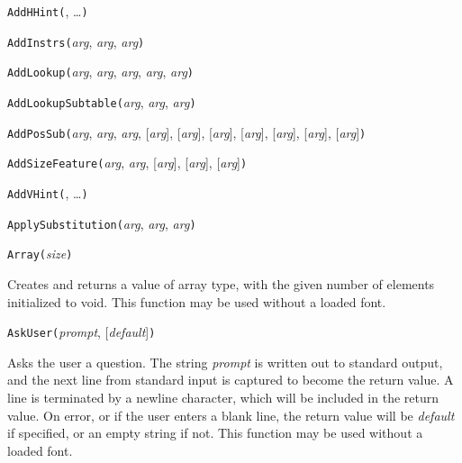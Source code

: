 
\noindent\texttt{AddHHint(}, \ldots\texttt{)}


\noindent\texttt{AddInstrs(}\textit{arg}, \textit{arg}, \textit{arg}\texttt{)}


\noindent\texttt{AddLookup(}\textit{arg}, \textit{arg}, \textit{arg}, \textit{arg}, \textit{arg}\texttt{)}


\noindent\texttt{AddLookupSubtable(}\textit{arg}, \textit{arg}, \textit{arg}\texttt{)}


\noindent\texttt{AddPosSub(}\textit{arg}, \textit{arg}, \textit{arg}, [\textit{arg}], [\textit{arg}], [\textit{arg}], [\textit{arg}], [\textit{arg}], [\textit{arg}], [\textit{arg}]\texttt{)}


\noindent\texttt{AddSizeFeature(}\textit{arg}, \textit{arg}, [\textit{arg}], [\textit{arg}], [\textit{arg}]\texttt{)}


\noindent\texttt{AddVHint(}, \ldots\texttt{)}


\noindent\texttt{ApplySubstitution(}\textit{arg}, \textit{arg}, \textit{arg}\texttt{)}


\noindent\texttt{Array(}\textit{size}\texttt{)}

Creates and returns a value of array type, with the given number of
elements initialized to void.
This function may be used without a loaded font.


\noindent\texttt{AskUser(}\textit{prompt}, [\textit{default}]\texttt{)}

Asks the user a question.  The string \textit{prompt} is written out to
standard output, and the next line from standard input is captured to become
the return value.  A line is terminated by a newline character, which will
be included in the return value.  On error, or if the user enters a blank
line, the return value will be \textit{default} if specified, or an empty
string if not.
This function may be used without a loaded font.


